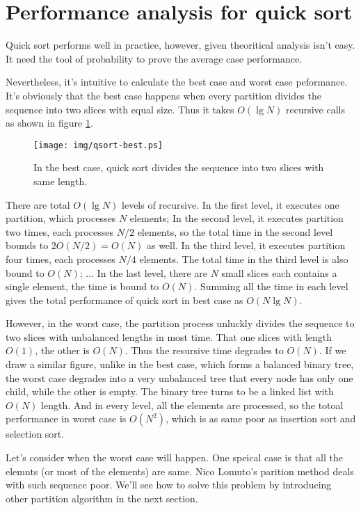 \documentclass{article}
\begin{document}
\section{Performance analysis for quick sort}

Quick sort performs well in practice, however, given theoritical analysis isn't easy. It need the tool
of probability to prove the average case performance.

Nevertheless, it's intuitive to calculate the best case and worst case peformance. It's obviously that
the best case happens when every partition divides the sequence into two slices with equal size. Thus
it takes $O(\lg N)$ recursive calls as shown in figure \ref{fig:qsort-best}.

\begin{figure}[htbp]
 \centering
 \texttt{[image: img/qsort-best.ps]}
 \caption{In the best case, quick sort divides the sequence into two slices with same length.}
 \label{fig:qsort-best}
\end{figure}

There are total $O(\lg N)$ levels of recursive. In the first level, it executes one partition, which
 processes $N$ elements; In the second level, it executes partition two times, each processes $N/2$
elements, so the total time in the second level bounds to $2 O(N/2) = O(N)$ as well. In the third
level, it executes partition four times, each processes $N/4$ elements. The total time in the third
level is also bound to $O(N)$; ... In the last level, there are $N$ small slices each contains a
single element, the time is bound to $O(N)$. Summing all the time in each level gives the total
performance of quick sort in best case as $O(N \lg N)$.

However, in the worst case, the partition process unluckly divides the sequence to two slices 
with unbalanced lengths in most time. That one slices with length $O(1)$, the other is $O(N)$.
Thus the resursive time degrades to $O(N)$. If we draw a similar figure, unlike in the best
case, which forms a balanced binary tree, the worst case degrades into a very unbalanced tree
that every node has only one child, while the other is empty. The binary tree turns to be
a linked list with $O(N)$ length. And in every level, all the elements are processed, so the
totoal performance in worst case is $O(N^2)$, which is as same poor as insertion sort and
selection sort.

Let's consider when the worst case will happen. One speical case is that  
all the elemnts (or most of the elements) are same. Nico Lomuto's parition method deals
with such sequence poor. We'll see how to solve this problem by introducing other
partition algorithm in the next section.
\end{document}
